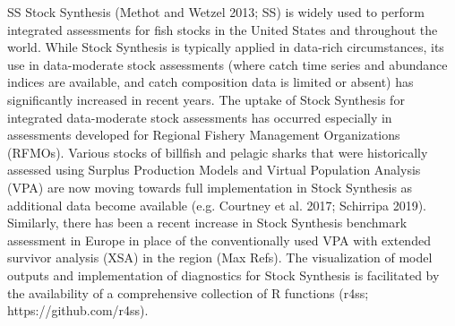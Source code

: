 \begin{description}
\item{SS} 
Stock Synthesis (Methot and Wetzel 2013; SS) is widely used to perform integrated assessments for fish stocks in the United States and throughout the world. While Stock Synthesis is typically applied in data-rich circumstances, its use in data-moderate stock assessments (where catch time series and abundance indices are available, and catch composition data is limited or absent) has significantly increased in recent years. The uptake of Stock Synthesis for integrated data-moderate stock assessments has occurred especially in assessments developed for Regional Fishery Management Organizations (RFMOs). Various stocks of billfish and pelagic sharks that were historically assessed using Surplus Production Models and Virtual Population Analysis (VPA) are now moving towards full implementation in Stock Synthesis as additional data become available (e.g. Courtney et al. 2017; Schirripa 2019). Similarly, there has been a recent increase in Stock Synthesis benchmark assessment in Europe in place of the conventionally used VPA with extended survivor analysis (XSA) in the region (Max Refs). The visualization of model outputs and implementation of diagnostics for Stock Synthesis is facilitated by the availability of a comprehensive collection of R functions (r4ss; https://github.com/r4ss).


\end{description}
